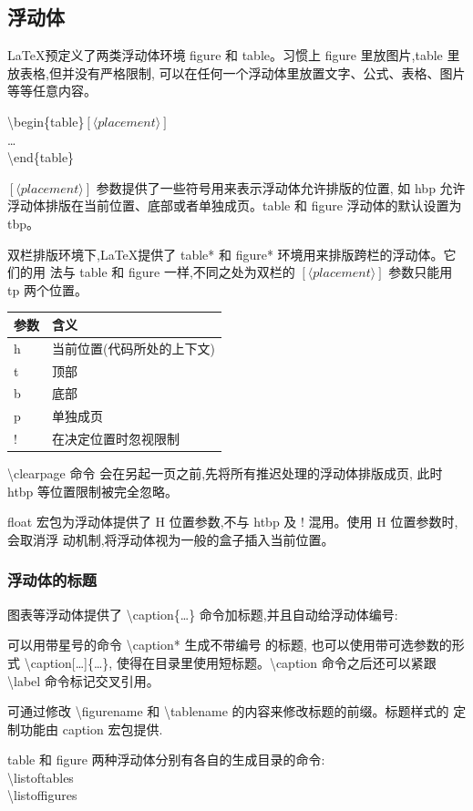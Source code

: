 \documentclass[a4paper]{ctexart}
\begin{document}
    \subsection{浮动体}
    \LaTeX 预定义了两类浮动体环境 figure 和 table。习惯上 figure 里放图片,table 里放表格,但并没有严格限制,%
    可以在任何一个浮动体里放置文字、公式、表格、图片等等任意内容。\par
    \textbackslash begin\{table\}$[\langle placement\rangle]$\\
    \ldots\\
    \textbackslash end\{table\}\par
    $[\langle placement\rangle]$ 参数提供了一些符号用来表示浮动体允许排版的位置,%
    如 hbp 允许浮动体排版在当前位置、底部或者单独成页。table 和 figure 浮动体的默认设置为 tbp。\par
    双栏排版环境下,\LaTeX 提供了 table* 和 figure* 环境用来排版跨栏的浮动体。它们的用%
    法与 table 和 figure 一样,不同之处为双栏的 $[\langle placement\rangle]$ 参数只能用 tp 两个位置。\par
    \begin{tabular}{ll}
        \toprule
        参数     & 含义\\
        \midrule
        h       & 当前位置(代码所处的上下文)\\
        t       & 顶部\\
        b       & 底部\\ 
        p       & 单独成页\\ 
        !       & 在决定位置时忽视限制\\
        \bottomrule
    \end{tabular}\par
    \textbackslash clearpage 命令 会在另起一页之前,先将所有推迟处理的浮动体排版成页,%
    此时 htbp 等位置限制被完全忽略。\par
    float 宏包为浮动体提供了 H 位置参数,不与 htbp 及 ! 混用。使用 H 位置参数时,%
    会取消浮 动机制,将浮动体视为一般的盒子插入当前位置。\par
    \subsubsection{浮动体的标题}
    图表等浮动体提供了 \textbackslash caption\{\ldots\} 命令加标题,并且自动给浮动体编号:\par
    可以用带星号的命令 \textbackslash caption* 生成不带编号 的标题,%
    也可以使用带可选参数的形式 \textbackslash caption[\ldots]\{\ldots\},
    使得在目录里使用短标题。\textbackslash caption 命令之后还可以紧跟 %
    \textbackslash label 命令标记交叉引用。\par
    可通过修改 \textbackslash figurename 和 \textbackslash tablename %
    的内容来修改标题的前缀。标题样式的 定制功能由 caption 宏包提供.\par
    table 和 figure 两种浮动体分别有各自的生成目录的命令:\\
    \textbackslash listoftables\\
    \textbackslash listoffigures\par    
\end{document}
